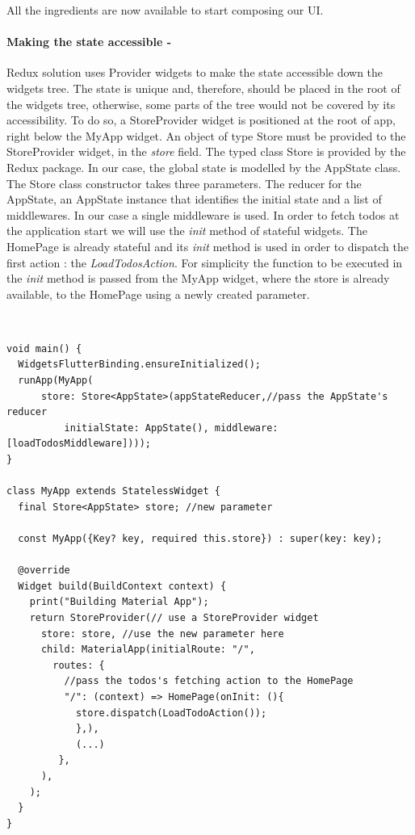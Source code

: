 All the ingredients are now available to start composing our UI.

\paragraph{Making the state accessible - }
\label{subpar:todo_app_bloc_core_state}
Redux solution uses Provider widgets to make the state accessible down the widgets tree. The state is unique and, therefore, should  be placed in the root of the widgets tree, otherwise, some parts of the tree would not be covered by its accessibility. To do so, a StoreProvider widget is positioned at the root of app, right below the MyApp widget. An object of type Store must be provided to the StoreProvider widget, in the \textit{store }field. The typed class Store is provided by the Redux package. In our case, the global state is modelled by the AppState class. The Store class constructor takes three parameters. The reducer for the AppState, an AppState instance that identifies the initial state and a list of middlewares. In our case a single middleware is used. In order to fetch todos at the application start we will use the \textit{init} method of stateful widgets.  The HomePage is already stateful and its \textit{init} method is used in order to dispatch the first action : the \textit{LoadTodosAction}. For simplicity the function to be executed in the \textit{init} method is passed from the MyApp widget, where the store is already available, to the HomePage using a newly created parameter.
\begin{code}
\mbox{}\\
 \mbox{}
		\label{code:2.14}
\begin{verbatim}
void main() {
  WidgetsFlutterBinding.ensureInitialized();
  runApp(MyApp(
      store: Store<AppState>(appStateReducer,//pass the AppState's reducer
          initialState: AppState(), middleware: [loadTodosMiddleware])));
}

class MyApp extends StatelessWidget {
  final Store<AppState> store; //new parameter

  const MyApp({Key? key, required this.store}) : super(key: key);

  @override
  Widget build(BuildContext context) {
    print("Building Material App");
    return StoreProvider(// use a StoreProvider widget
      store: store, //use the new parameter here
      child: MaterialApp(initialRoute: "/",
        routes: {
          //pass the todos's fetching action to the HomePage
          "/": (context) => HomePage(onInit: (){
            store.dispatch(LoadTodoAction());
            },),
            (...) 
         },
      ),
    );
  }
}
\end{verbatim}
\mbox{}
\end{code}


